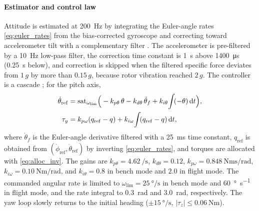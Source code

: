 \paragraph{Estimator and control law}
Attitude is estimated at \SI{200}{\hertz} by integrating the Euler-angle rates \eqref{eq:euler_rates} from the bias-corrected gyroscope and correcting toward accelerometer tilt with a complementary filter \cite{mahony2008}. The accelerometer is pre-filtered by a \SI{10}{\hertz} low-pass filter, the correction time constant is \SI{1}{\second} above \SI{1400}{\micro\second} (\SI{0.25}{\second} below), and correction is skipped when the filtered specific force deviates from $1\,g$ by more than $0.15\,g$, because rotor vibration reached $2\,g$. The controller is a cascade \cite{mahony2012,pounds2010}; for the pitch axis,
\begin{align}
  \dot\theta_{\mathrm{ref}}&=\operatorname{sat}_{\omega_{\lim}}\!\Big(-k_{p\theta}\,\theta-k_{d\theta}\,\dot\theta_f+k_{i\theta}\!\int\!(-\theta)\,\mathrm{d} t\Big), \notag\\
  \tau_y&=k_{p\omega}(q_{\mathrm{ref}}-q)+k_{i\omega}\!\int\!(q_{\mathrm{ref}}-q)\,\mathrm{d} t, \label{eq:cascade}
\end{align}
where $\dot\theta_f$ is the Euler-angle derivative filtered with a \SI{25}{\milli\second} time constant, $q_{\mathrm{ref}}$ is obtained from $(\dot\phi_{\mathrm{ref}},\dot\theta_{\mathrm{ref}})$ by inverting \eqref{eq:euler_rates}, and torques are allocated with \eqref{eq:alloc_inv}. The gains are $k_{p\theta}=\SI{4.62}{\per\second}$, $k_{d\theta}=0.12$, $k_{p\omega}=\SI{0.848}{\newton\metre\second\per\radian}$, $k_{i\omega}=\SI{0.10}{\newton\metre\per\radian}$, and $k_{i\theta}=0.8$ in bench mode and $2.0$ in flight mode. The commanded angular rate is limited to $\omega_{\lim}=\SI{25}{\degree\per\second}$ in bench mode and \SI{60}{\degree\per\second} in flight mode, and the rate integral to \SI{0.3}{\radian} and \SI{3.0}{\radian}, respectively. The yaw loop slowly returns to the initial heading ($\pm\SI{15}{\degree\per\second}$, $|\tau_z|\le\SI{0.06}{\newton\metre}$).

